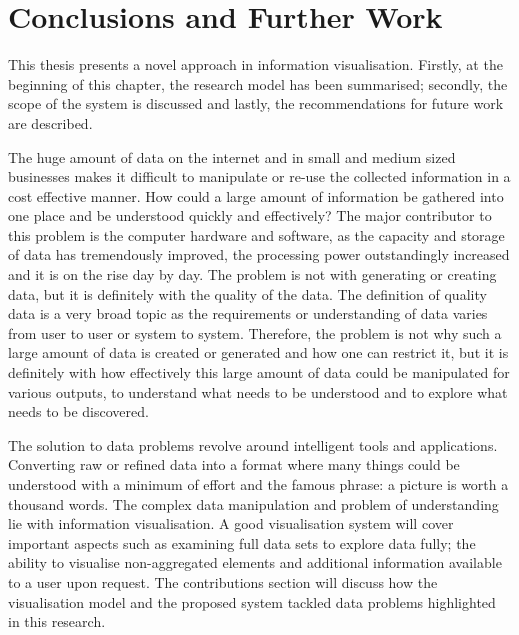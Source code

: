 
\chapter{Conclusions and Further Work} %

\label{Chapter8} %


This thesis presents a novel approach in information visualisation. Firstly,  at the beginning of this chapter, the research model has been summarised; secondly, the scope of the system is discussed and lastly, the recommendations for future work are described.

The huge amount of data on the internet and in small and medium sized businesses makes it difficult to manipulate or re-use the collected information in a cost effective manner. How could a large amount of information be gathered into one place and be understood quickly and effectively? The major contributor to this problem is the computer hardware and software, as the capacity and storage of data has tremendously improved, the processing power outstandingly increased and it is on the rise day by day. The problem is not with generating or creating data, but it is definitely with the quality of the data. The definition of quality data is a very broad topic as the requirements or understanding of data varies from user to user or system to system. Therefore, the problem is not why such a large amount of data is created or generated and how one can restrict it, but it is definitely with how effectively this large amount of data could be manipulated for various outputs, to understand what needs to be understood and to explore what needs to be discovered.

The solution to data problems revolve around intelligent tools and applications. Converting raw or refined data into a format where many things could be understood with a minimum of effort and the famous phrase: a picture is worth a thousand words. The complex data manipulation and problem of understanding lie with information visualisation. A good visualisation system will cover important aspects such as examining full data sets to explore data fully; the ability to visualise non-aggregated elements and additional information available to a user upon request. The contributions section will discuss how the visualisation model and the proposed system tackled data problems highlighted in this research. 

